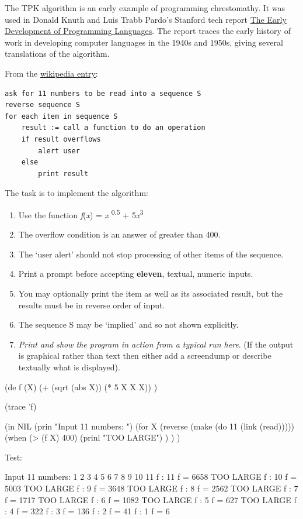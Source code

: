 The TPK algorithm is an early example of programming chrestomathy. It
was used in Donald Knuth and Luis Trabb Pardo's Stanford tech report
\href{http://bitsavers.org/pdf/stanford/cs\_techReports/STAN-CS-76-562\_EarlyDevelPgmgLang\_Aug76.pdf}{The
Early Development of Programming Languages}. The report traces the early
history of work in developing computer languages in the 1940s and 1950s,
giving several translations of the algorithm.

From the
\href{http://en.wikipedia.org/wiki/Trabb\_Pardo\%E2\%80\%93Knuth\_algorithm}{wikipedia
entry}:

\begin{verbatim}
ask for 11 numbers to be read into a sequence S
reverse sequence S
for each item in sequence S
    result := call a function to do an operation
    if result overflows
        alert user
    else
        print result
\end{verbatim}

The task is to implement the algorithm:

\begin{enumerate}
\item
  Use the function \emph{f}(\emph{x}) = \textbar{} \emph{x} \textbar{}
  \textsuperscript{0.5} + 5\emph{x}\textsuperscript{3}
\item
  The overflow condition is an answer of greater than 400.
\item
  The `user alert' should not stop processing of other items of the
  sequence.
\item
  Print a prompt before accepting \textbf{eleven}, textual, numeric
  inputs.
\item
  You may optionally print the item as well as its associated result,
  but the results must be in reverse order of input.
\item
  The sequence S may be `implied' and so not shown explicitly.
\item
  \emph{Print and show the program in action from a typical run here}.
  (If the output is graphical rather than text then either add a
  screendump or describe textually what is displayed).
\end{enumerate}

\begin{wideverbatim}

(de f (X)
   (+ (sqrt (abs X)) (* 5 X X X)) )

(trace 'f)

(in NIL
   (prin "Input 11 numbers: ")
   (for X (reverse (make (do 11 (link (read)))))
      (when (> (f X) 400)
         (prinl "TOO LARGE") ) ) )

Test:

Input 11 numbers: 1 2 3 4 5 6 7 8 9 10 11
 f : 11
 f = 6658
TOO LARGE
 f : 10
 f = 5003
TOO LARGE
 f : 9
 f = 3648
TOO LARGE
 f : 8
 f = 2562
TOO LARGE
 f : 7
 f = 1717
TOO LARGE
 f : 6
 f = 1082
TOO LARGE
 f : 5
 f = 627
TOO LARGE
 f : 4
 f = 322
 f : 3
 f = 136
 f : 2
 f = 41
 f : 1
 f = 6

\end{wideverbatim}


